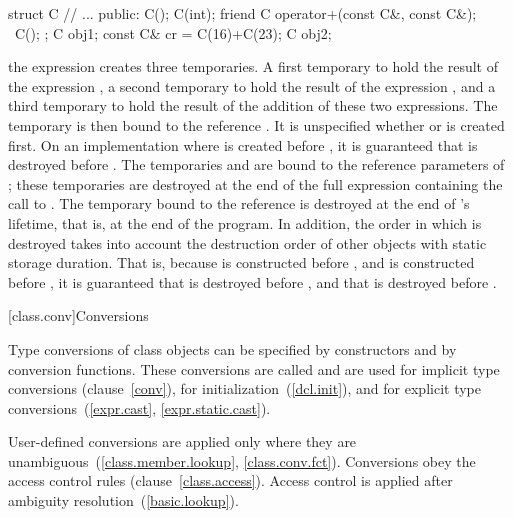 \begin{codeblock}
struct C {
	// ...
public:
	C();
	C(int);
	friend C operator+(const C&, const C&);
	~C();
};
C obj1;
const C& cr = C(16)+C(23);
C obj2;
\end{codeblock}

the expression
creates three temporaries. A first temporary
to hold the result of the expression
,
a second temporary
to hold the result of the expression
,
and a third temporary
to hold the result of the addition of these two expressions.
The temporary
is then bound to the reference
.
It is unspecified whether
or
is created first.
On an implementation where
is created before
,
it is guaranteed that
is destroyed before
.
The temporaries
and
are bound to the reference parameters of
;
these temporaries are destroyed at the end of the full expression
containing the call to
.
The temporary
bound to the reference
is destroyed at the end of
's
lifetime, that is, at the end of the program.
In addition, the order in which
is destroyed takes into account the destruction order of other objects with
static storage duration.
That is, because
is constructed before
,
and
is constructed before
,
it is guaranteed that
is destroyed before
,
and that
is destroyed before
.
\exitexample

[class.conv]{Conversions}

\pnum
{}%
%
%
%
%
Type conversions of class objects can be specified by constructors and
by conversion functions.
These conversions are called
and are used for implicit type conversions (clause~\ref{conv}),
for initialization~(\ref{dcl.init}),
and for explicit type conversions~(\ref{expr.cast}, \ref{expr.static.cast}).

\pnum
User-defined conversions are applied only where they are unambiguous~(\ref{class.member.lookup}, \ref{class.conv.fct}).
Conversions obey the access control rules (clause~\ref{class.access}).
Access control is applied after ambiguity resolution~(\ref{basic.lookup}).

